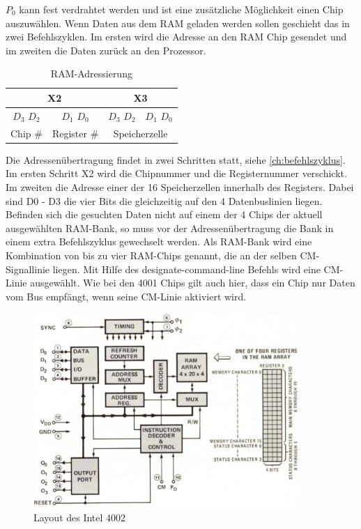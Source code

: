 $P_0$ kann fest verdrahtet werden und ist eine zusätzliche Möglichkeit einen Chip auszuwählen. Wenn Daten aus dem RAM geladen werden sollen geschieht das in zwei Befehlszyklen. Im ersten wird die Adresse an den RAM Chip gesendet und im zweiten die Daten zurück an den Prozessor.
\begin{table}[H]
	\centering
	\begin{tabular}{c | c | c | c}
		\multicolumn{2}{c|}{X2} & \multicolumn{2}{c}{X3} \\
		\hline
		$D_3$ \space\space\space $D_2$ & $D_1$ \space\space\space $D_0$ & $D_3$ \space\space\space $D_2$ & $D_1$ \space\space\space $D_0$ \\
		Chip {\#} & Register {\#} & \multicolumn{2}{c}{Speicherzelle}
	\end{tabular}
	\caption{RAM-Adressierung}
	\label{ramadresse}
\end{table}
Die Adressenübertragung findet in zwei Schritten statt, siehe \ref{ch:befehlszyklus}.
Im ersten Schritt X2 wird die Chipnummer und die Registernummer verschickt. 
Im zweiten die Adresse einer der 16 Speicherzellen innerhalb des Registers.
Dabei sind D0 - D3 die vier Bits die gleichzeitig auf den 4 Datenbuslinien liegen. Befinden sich die gesuchten Daten nicht auf einem der 4 Chips der aktuell ausgewählten RAM-Bank, so muss vor der Adressenübertragung die Bank in einem extra Befehlszyklus gewechselt werden. Als RAM-Bank wird eine Kombination von bis zu vier RAM-Chips genannt, die an der selben CM-Signallinie liegen. Mit Hilfe des designate-command-line Befehls wird eine CM-Linie ausgewählt. Wie bei den 4001 Chips gilt auch hier, dass ein Chip nur Daten vom Bus empfängt, wenn seine CM-Linie aktiviert wird.
 \begin{figure}[h]
 	\centering
 	\includegraphics[width=0.9\textwidth]{figures/layout_4002.png}
 	\caption{Layout des Intel 4002}
 	\label{fig:layout_4002}
 \end{figure}
 

